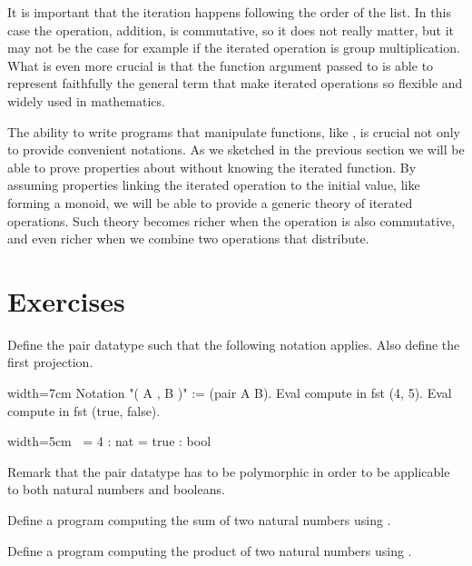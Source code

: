 It is important that the iteration happens following the order of the list.
In this case the operation, addition, is commutative, so it does not really
matter, but it may not be the case for example if the iterated operation
is group multiplication.  What is even more crucial is that
the function argument passed to  is able to represent
faithfully the general term that make iterated operations so
flexible and widely used in mathematics.

The ability to write programs that manipulate functions, like , is
crucial not only to provide convenient notations.  As we sketched in the
previous section we will be able to prove properties about  without
knowing the iterated function.  By assuming properties linking the iterated
operation to the initial value, like forming a monoid, we will be able to
provide a generic theory of iterated operations.  Such theory becomes richer
when the operation is also commutative, and even richer when we combine two
operations that distribute.

\section{Exercises}


\begin{Exercise}[label=ex:pair,difficulty=0,title={The pair datatype}]
Define the pair datatype such that the following notation
applies.  Also define the first projection.

\begin{coq}{}{width=7cm}
Notation "( A , B )" := (pair A B).
Eval compute in fst (4, 5).
Eval compute in fst (true, false).
\end{coq}
\begin{coqout}{}{width=5cm}
$~$
     = 4 : nat
     = true : bool
\end{coqout}
Remark that the pair datatype has to be polymorphic in order to
be applicable to both natural numbers and booleans.
\end{Exercise}

\begin{Exercise}[label=ex:iteradd,difficulty=0,title={Addition with iteration}]
Define a program computing the sum of two natural numbers
using .
\end{Exercise}

\begin{Exercise}[label=ex:itermul,difficulty=0,title={Multiplication with iteration}]
Define a program computing the product of two natural numbers
using .
\end{Exercise}

